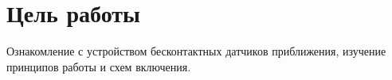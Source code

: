 \section{Цель работы}
Ознакомление с устройством бесконтактных датчиков приближения, изучение принципов работы и схем включения.